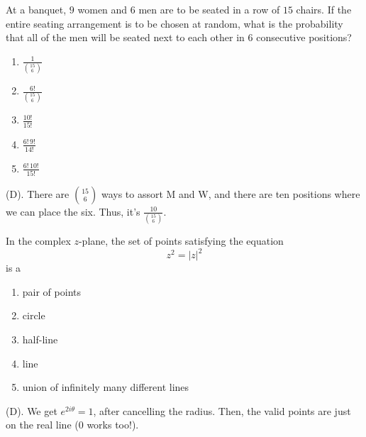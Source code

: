 \begin{exercise}
At a banquet, $9$ women and $6$ men are to be seated in a row of $15$ chairs. 
If the entire seating arrangement is to be chosen at random, what is the probability that all of the men 
will be seated next to each other in $6$ consecutive positions?
\begin{enumerate}[label=(\Alph*)]
    \item $\displaystyle \frac{1}{\binom{15}{6}}$
    \item $\displaystyle \frac{6!}{\binom{15}{6}}$
    \item $\displaystyle \frac{10!}{15!}$
    \item $\displaystyle \frac{6!\,9!}{14!}$
    \item $\displaystyle \frac{6!\,10!}{15!}$
\end{enumerate}
\end{exercise}
\begin{solution}
(D). There are $\binom{15}{6}$ ways to assort M and W, and there are ten positions where we 
can place the six. Thus, it's $\frac{10}{\binom{15}{6}}$.
\end{solution}

\begin{exercise}
In the complex $z$-plane, the set of points satisfying the equation
\[
z^2=|z|^2
\]
is a
\begin{enumerate}[label=(\Alph*)]
    \item pair of points
    \item circle
    \item half-line
    \item line
    \item union of infinitely many different lines
\end{enumerate}
\end{exercise}
\begin{solution}
(D). We get $e^{2i\theta} = 1$, after cancelling the radius. 
Then, the valid points are just on the real line ($0$ works too!).
\end{solution}

